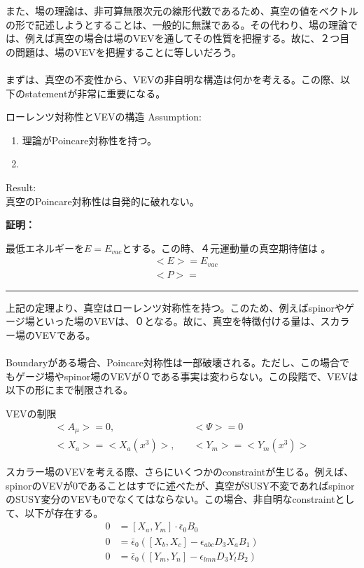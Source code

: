 \documentclass[dvipdfmx,a4paper,10.5pt]{article}
\numberwithin{equation}{section}
\newenvironment{proofbox}
{\begin{prooflabel}\textbf{証明：}\end{prooflabel}\vspace{0.8em}}
{\par\vspace{1em}\hrule\vspace{1em}}
\begin{document}
また、場の理論は、非可算無限次元の線形代数であるため、真空の値をベクトルの形で記述しようとすることは、一般的に無謀である。その代わり、場の理論では、例えば真空の場合は場のVEVを通してその性質を把握する。故に、２つ目の問題は、場のVEVを把握することに等しいだろう。\\
\\
まずは、真空の不変性から、VEVの非自明な構造は何かを考える。この際、以下のstatementが非常に重要になる。
\begin{theorembox}{ローレンツ対称性とVEVの構造}
Assumption:
    \begin{enumerate}
        \item 理論がPoincare対称性を持つ。
        \item 
    \end{enumerate}
    Result:\\
    真空のPoincare対称性は自発的に破れない。
\end{theorembox}
\begin{proofbox}
    最低エネルギーを$E=E_{vac}$とする。この時、４元運動量の真空期待値は
    。
    \begin{align*}
        &<E>=E_{vac}\\
        &<P>=
    \end{align*}
\end{proofbox}
上記の定理より、真空はローレンツ対称性を持つ。このため、例えばspinorやゲージ場といった場のVEVは、０となる。故に、真空を特徴付ける量は、スカラー場のVEVである。\\
\\
Boundaryがある場合、Poincare対称性は一部破壊される。ただし、この場合でもゲージ場やspinor場のVEVが０である事実は変わらない。この段階で、VEVは以下の形にまで制限される。
\begin{resultbox}{VEVの制限}
    \begin{align*}
        <A_{\mu}>=0,&\quad <\Psi>=0\\
        <X_{a}>=<X_{a}(x^{3})>,&\quad <Y_{m}>=<Y_{m}(x^{3})>
    \end{align*}
\end{resultbox}
スカラー場のVEVを考える際、さらにいくつかのconstraintが生じる。例えば、spinorのVEVが0であることはすでに述べたが、真空がSUSY不変であればspinor
のSUSY変分のVEVも0でなくてはならない。この場合、非自明なconstraintとして、以下が存在する。
\begin{align*}
    0&=[X_{a},Y_{m}]\cdot\bar{\epsilon}_{0}B_{0}\\
    0&=\bar{\epsilon}_{0}([X_{b},X_{c}]-\epsilon_{abc}D_{3}X_{a}B_{1})\\
    0&=\bar{\epsilon}_{0}([Y_{m},Y_{n}]-\epsilon_{lmn}D_{3}Y_{l}B_{2})
\end{align*}
\end{document}
